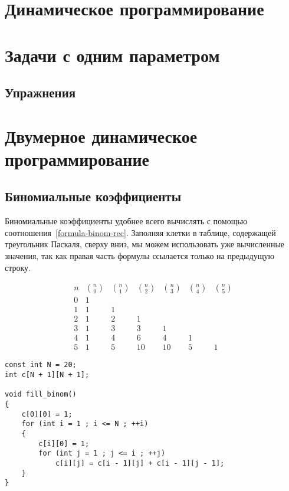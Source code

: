 \documentclass[14pt,openany]{book}
\begin{document}
\chapter{Динамическое программирование}



\chapter{Задачи с одним параметром}



\section{Упражнения}



\chapter{Двумерное динамическое программирование}

\section{Биномиальные коэффициенты}

Биномиальные коэффициенты удобнее всего вычислять с помощью соотношения~\ref{formula-binom-rec}.
Заполняя клетки в таблице, содержащей треугольник Паскаля, сверху вниз, мы можем
использовать уже вычисленные значения, так как правая часть формулы ссылается только на
предыдущую строку.

$$
 \begin{array}{ccccccc}
 n & \binom{n}{0} & \binom{n}{1} & \binom{n}{2} & \binom{n}{3} & \binom{n}{4} & \binom{n}{5} \\
 0 & 1 \\
 1 & 1 & 1 \\
 2 &  1 & 2 & 1 \\
 3 & 1 & 3 & 3 & 1 \\
 4 & 1 & 4 & 6 & 4 & 1 \\
 5 & 1 & 5 & 10 & 10 & 5 & 1
 \end{array}
$$

\begin{lstlisting}
const int N = 20;
int c[N + 1][N + 1];

void fill_binom()
{
    c[0][0] = 1;
    for (int i = 1 ; i <= N ; ++i)
    {
        c[i][0] = 1;
        for (int j = 1 ; j <= i ; ++j)
            c[i][j] = c[i - 1][j] + c[i - 1][j - 1];
    }
}
\end{lstlisting}
\end{document}
